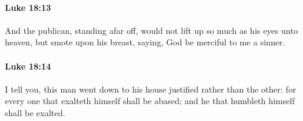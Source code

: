 		\paragraph{Luke 18:13} %
			\label{LUKE-18-13}

			And the publican, standing afar off, would not lift up so much as his eyes unto heaven, but smote upon his breast, saying, God be merciful to me a sinner.

			\begin{framed}
			\scriptsize
				\begin{compactdesc}
					\item[SBLG] 
				\end{compactdesc}
			\end{framed}

		\paragraph{Luke 18:14} %
			\label{LUKE-18-14}

			I tell you, this man went down to his house justified rather than the other: for every one that exalteth himself shall be abased; and he that humbleth himself shall be exalted.

